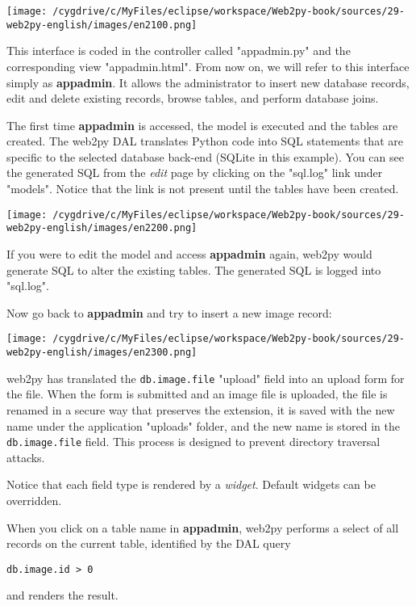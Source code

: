 \documentclass[justified,sixbynine,notoc]{tufte-book}
\def\ft{\small\tt}
\begin{document}
\begin{fullwidth}
\goodbreak\begin{center}\texttt{[image: /cygdrive/c/MyFiles/eclipse/workspace/Web2py-book/sources/29-web2py-english/images/en2100.png]}\end{center}


This interface is coded in the controller called "appadmin.py" and the corresponding view "appadmin.html". From now on, we will refer to this interface simply as {\bf appadmin}. It allows the administrator to insert new database records, edit and delete existing records, browse tables, and perform database joins.

The first time {\bf appadmin} is accessed, the model is executed and the tables are created. The web2py DAL translates Python code into SQL statements that are specific to the selected database back-end (SQLite in this example). You can see the generated SQL from the {\it edit} page by clicking on the "sql.log" link under "models". Notice that the link is not present until the tables have been created.


\goodbreak\begin{center}\texttt{[image: /cygdrive/c/MyFiles/eclipse/workspace/Web2py-book/sources/29-web2py-english/images/en2200.png]}\end{center}


If you were to edit the model and access {\bf appadmin} again, web2py would generate SQL to alter the existing tables. The generated SQL is logged into "sql.log".

Now go back to {\bf appadmin} and try to insert a new image record:


\goodbreak\begin{center}\texttt{[image: /cygdrive/c/MyFiles/eclipse/workspace/Web2py-book/sources/29-web2py-english/images/en2300.png]}\end{center}

\noindent web2py has translated the {\ft db.image.file} "upload" field into an upload form for the file. When the form is submitted and an image file is uploaded, the file is renamed in a secure way that preserves the extension, it is saved with the new name under the application "uploads" folder, and the new name is stored in the {\ft db.image.file} field. This process is designed to prevent directory traversal attacks.

Notice that each field type is rendered by a {\it widget}. Default widgets can be overridden.

When you click on a table name in {\bf appadmin}, web2py performs a select of all records on the current table, identified by the DAL query
\begin{lstlisting}
db.image.id > 0
\end{lstlisting}
\noindent and renders the result.



\end{fullwidth}
\end{document}
